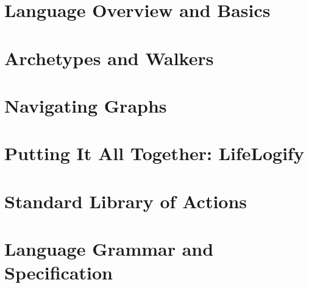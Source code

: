 \chapter{Language Overview and Basics}
\chapter{Archetypes and Walkers}
\chapter{Navigating Graphs}
\chapter{Putting It All Together: LifeLogify}
\chapter{Standard Library of Actions}
\chapter{Language Grammar and Specification}
